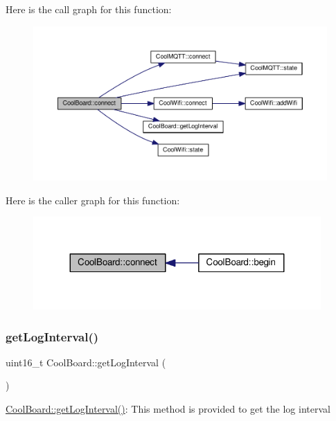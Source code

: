 Here is the call graph for this function\+:\nopagebreak
\begin{figure}[H]
\begin{center}
\leavevmode
\includegraphics[width=350pt]{classCoolBoard_a519de78b807f8ec6463ff484eb925918_cgraph}
\end{center}
\end{figure}
Here is the caller graph for this function\+:\nopagebreak
\begin{figure}[H]
\begin{center}
\leavevmode
\includegraphics[width=311pt]{classCoolBoard_a519de78b807f8ec6463ff484eb925918_icgraph}
\end{center}
\end{figure}
\mbox{\label{classCoolBoard_aaa24480b273fc095a1356a589c333781}} 
\subsubsection{\texorpdfstring{get\+Log\+Interval()}{getLogInterval()}}
{\footnotesize\ttfamily uint16\+\_\+t Cool\+Board\+::get\+Log\+Interval (\begin{DoxyParamCaption}{ }\end{DoxyParamCaption})}

\hyperlink{classCoolBoard_aaa24480b273fc095a1356a589c333781}{Cool\+Board\+::get\+Log\+Interval()}\+: This method is provided to get the log interval

